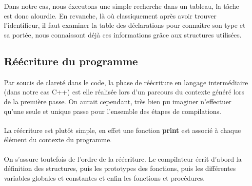 Dans notre cas, nous éxecutons une simple recherche dans un tableau,
la tâche est donc alourdie. En revanche, là où classiquement après avoir 
trouver l'identifieur, il faut examiner la table des déclarations pour 
connaitre son type et sa portée, nous connaissont déjà ces informations grâce 
aux structures utilisées.

\subsection{Réécriture du programme}

\paragraph{}Par soucis de clareté dans le code, la phase de réécriture en 
langage intermédiaire (dans notre cas C++) est elle réalisée lors d'un parcours 
du contexte généré lors de la première passe. On aurait cependant, très bien
pu imaginer n'effectuer qu'une seule et unique passe pour l'ensemble des 
étapes de compilations.

\paragraph{}La réécriture est plutôt simple, en effet une fonction 
\textbf{print} est associé à chaque élément du contexte du programme. 

\paragraph{}On s'assure toutefois de l'ordre de la réécriture. Le compilateur
écrit d'abord la définition des structures, puis les prototypes des fonctions,
puis les différentes variables globales et constantes et enfin les fonctions et 
procédures.
